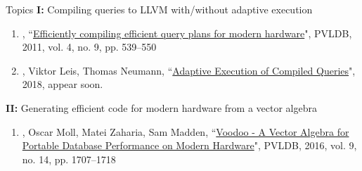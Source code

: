 \begin{frame}{Topics} 
\textbf{I:} Compiling queries to LLVM with/without adaptive execution
\begin{enumerate}
\item {},
      ``\uline{Efficiently compiling efficient query plans for modern hardware}",
      PVLDB, 2011, vol. 4, no. 9, pp. 539--550
\item {}, Viktor Leis, Thomas Neumann,
      ``\uline{Adaptive Execution of Compiled Queries}", 2018, appear soon.
\end{enumerate} 
\pause
\textbf{II:} Generating efficient code for modern hardware from a vector algebra 
\begin{enumerate} 
\item {}, Oscar Moll, Matei Zaharia, Sam Madden,
      ``\uline{Voodoo - A Vector Algebra for Portable Database Performance on Modern Hardware}",
      PVLDB, 2016, vol. 9, no. 14, pp. 1707--1718 
\end{enumerate}
\end{frame}
